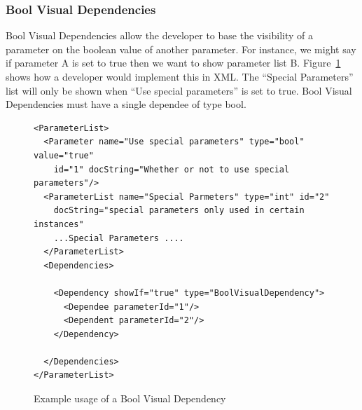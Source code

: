 \subsubsection{Bool Visual Dependencies}
Bool Visual Dependencies allow the developer to base the visibility of a parameter on the boolean value of another parameter. For instance, we might say
if parameter A is set to true then we want to show parameter list B. Figure~\ref{BoolVisXML} shows how a developer would implement this in XML. The
``Special Parameters'' list will only be shown when ``Use special parameters'' is set to true. Bool Visual Dependencies must have a single dependee of type bool.
\begin{figure}
\centering
{\footnotesize
\begin{Verbatim}
<ParameterList>
  <Parameter name="Use special parameters" type="bool" value="true"
    id="1" docString="Whether or not to use special parameters"/>
  <ParameterList name="Special Parmeters" type="int" id="2"
    docString="special parameters only used in certain instances" 
    ...Special Parameters ....
  </ParameterList>
  <Dependencies>

    <Dependency showIf="true" type="BoolVisualDependency">
      <Dependee parameterId="1"/>
      <Dependent parameterId="2"/>
    </Dependency>

  </Dependencies>
</ParameterList>
\end{Verbatim}
}
\caption{Example usage of a Bool Visual Dependency}
\label{BoolVisXML}
\end{figure}

